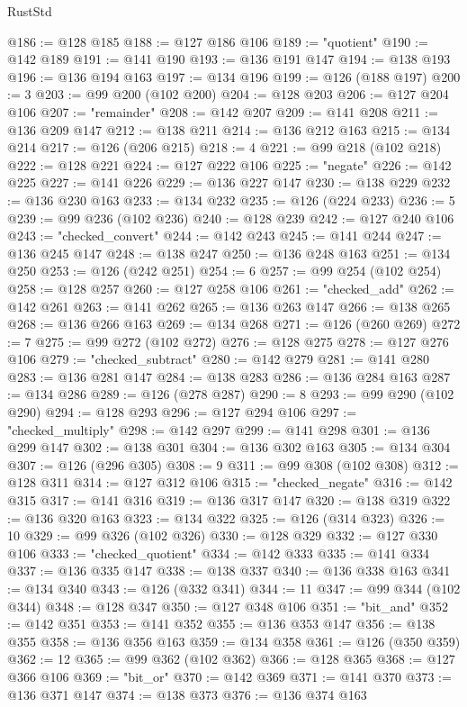 \begin{lexlean}{RustStd}
\begin{coremodule}
@186 := @128 @185
@188 := @127 @186 @106
@189 := "quotient"
@190 := @142 @189
@191 := @141 @190
@193 := @136 @191 @147
@194 := @138 @193
@196 := @136 @194 @163
@197 := @134 @196
@199 := @126 (@188 @197)
@200 := 3
@203 := @99 @200 (@102 @200)
@204 := @128 @203
@206 := @127 @204 @106
@207 := "remainder"
@208 := @142 @207
@209 := @141 @208
@211 := @136 @209 @147
@212 := @138 @211
@214 := @136 @212 @163
@215 := @134 @214
@217 := @126 (@206 @215)
@218 := 4
@221 := @99 @218 (@102 @218)
@222 := @128 @221
@224 := @127 @222 @106
@225 := "negate"
@226 := @142 @225
@227 := @141 @226
@229 := @136 @227 @147
@230 := @138 @229
@232 := @136 @230 @163
@233 := @134 @232
@235 := @126 (@224 @233)
@236 := 5
@239 := @99 @236 (@102 @236)
@240 := @128 @239
@242 := @127 @240 @106
@243 := "checked_convert"
@244 := @142 @243
@245 := @141 @244
@247 := @136 @245 @147
@248 := @138 @247
@250 := @136 @248 @163
@251 := @134 @250
@253 := @126 (@242 @251)
@254 := 6
@257 := @99 @254 (@102 @254)
@258 := @128 @257
@260 := @127 @258 @106
@261 := "checked_add"
@262 := @142 @261
@263 := @141 @262
@265 := @136 @263 @147
@266 := @138 @265
@268 := @136 @266 @163
@269 := @134 @268
@271 := @126 (@260 @269)
@272 := 7
@275 := @99 @272 (@102 @272)
@276 := @128 @275
@278 := @127 @276 @106
@279 := "checked_subtract"
@280 := @142 @279
@281 := @141 @280
@283 := @136 @281 @147
@284 := @138 @283
@286 := @136 @284 @163
@287 := @134 @286
@289 := @126 (@278 @287)
@290 := 8
@293 := @99 @290 (@102 @290)
@294 := @128 @293
@296 := @127 @294 @106
@297 := "checked_multiply"
@298 := @142 @297
@299 := @141 @298
@301 := @136 @299 @147
@302 := @138 @301
@304 := @136 @302 @163
@305 := @134 @304
@307 := @126 (@296 @305)
@308 := 9
@311 := @99 @308 (@102 @308)
@312 := @128 @311
@314 := @127 @312 @106
@315 := "checked_negate"
@316 := @142 @315
@317 := @141 @316
@319 := @136 @317 @147
@320 := @138 @319
@322 := @136 @320 @163
@323 := @134 @322
@325 := @126 (@314 @323)
@326 := 10
@329 := @99 @326 (@102 @326)
@330 := @128 @329
@332 := @127 @330 @106
@333 := "checked_quotient"
@334 := @142 @333
@335 := @141 @334
@337 := @136 @335 @147
@338 := @138 @337
@340 := @136 @338 @163
@341 := @134 @340
@343 := @126 (@332 @341)
@344 := 11
@347 := @99 @344 (@102 @344)
@348 := @128 @347
@350 := @127 @348 @106
@351 := "bit_and"
@352 := @142 @351
@353 := @141 @352
@355 := @136 @353 @147
@356 := @138 @355
@358 := @136 @356 @163
@359 := @134 @358
@361 := @126 (@350 @359)
@362 := 12
@365 := @99 @362 (@102 @362)
@366 := @128 @365
@368 := @127 @366 @106
@369 := "bit_or"
@370 := @142 @369
@371 := @141 @370
@373 := @136 @371 @147
@374 := @138 @373
@376 := @136 @374 @163

\end{coremodule}
\end{lexlean}
